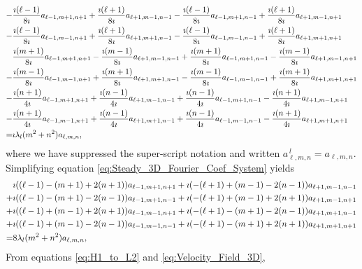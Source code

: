 \documentclass{article}
\newcommand{\0}{\mathbf{0}}
\newcommand{\1}{\mathbf{1}}
\newcommand{\2}{\mathbf{2}}
\newcommand{\3}{\mathbf{3}}
\newcommand{\4}{\mathbf{4}}
\newcommand{\5}{\mathbf{5}}
\newcommand{\6}{\mathbf{6}}
\newcommand{\7}{\mathbf{7}}
\newcommand{\8}{\mathbf{8}}
\begin{document}
\begin{align}\label{eq:Steady_3D_Fourier_Coef_System}
-&\frac{\imath(\ell-1)}{8\imath}a_{\ell-1,m+1,n+1}+\frac{\imath(\ell+1)}{8\imath}a_{\ell+1,m-1,n-1}
 -\frac{\imath(\ell-1)}{8\imath}a_{\ell-1,m+1,n-1}+\frac{\imath(\ell+1)}{8\imath}a_{\ell+1,m-1,n+1}\notag\\
 -&\frac{\imath(\ell-1)}{8\imath}a_{\ell-1,m-1,n+1}+\frac{\imath(\ell+1)}{8\imath}a_{\ell+1,m+1,n-1}
  -\frac{\imath(\ell-1)}{8\imath}a_{\ell-1,m-1,n-1}+\frac{\imath(\ell+1)}{8\imath}a_{\ell+1,m+1,n+1}
\notag\\
&\frac{\imath(m+1)}{8\imath}a_{\ell-1,m+1,n+1}-\frac{\imath(m-1)}{8\imath}a_{\ell+1,m-1,n-1}
  +\frac{\imath(m+1)}{8\imath}a_{\ell-1,m+1,n-1}-\frac{\imath(m-1)}{8\imath}a_{\ell+1,m-1,n+1}\notag\\
 -&\frac{\imath(m-1)}{8\imath}a_{\ell-1,m-1,n+1}+\frac{\imath(m+1)}{8\imath}a_{\ell+1,m+1,n-1}
  -\frac{\imath(m-1)}{8\imath}a_{\ell-1,m-1,n-1}+\frac{\imath(m+1)}{8\imath}a_{\ell+1,m+1,n+1}
\notag\\
-&\frac{\imath(n+1)}{4\imath}a_{\ell-1,m+1,n+1}+\frac{\imath(n-1)}{4\imath}a_{\ell+1,m-1,n-1}
  +\frac{\imath(n-1)}{4\imath}a_{\ell-1,m+1,n-1}-\frac{\imath(n+1)}{4\imath}a_{\ell+1,m-1,n+1}\notag\\
 -&\frac{\imath(n+1)}{4\imath}a_{\ell-1,m-1,n+1}+\frac{\imath(n-1)}{4\imath}a_{\ell+1,m+1,n-1}
  +\frac{\imath(n-1)}{4\imath}a_{\ell-1,m-1,n-1}-\frac{\imath(n+1)}{4\imath}a_{\ell+1,m+1,n+1}
\notag\\
=&\imath\lambda_l(m^2+n^2)a_{\ell,m,n},
\end{align}
%
where we have suppressed the super-script notation and written
$a^{\,l}_{\ell,m,n}=a_{\ell,m,n}$. Simplifying equation
\eqref{eq:Steady_3D_Fourier_Coef_System} yields
%
\begin{align}\label{eq:Steady_3D_Fourier_Coef_System_Simp}
 &\imath((\ell-1)-(m+1)+2(n+1))a_{\ell-1,m+1,n+1}+\imath(-(\ell+1)+(m-1)-2(n-1))a_{\ell+1,m-1,n-1}\notag\\
+&\imath((\ell-1)-(m+1)-2(n-1))a_{\ell-1,m+1,n-1}+\imath(-(\ell+1)+(m-1)+2(n+1))a_{\ell+1,m-1,n+1}\notag\\
+&\imath((\ell-1)+(m-1)+2(n+1))a_{\ell-1,m-1,n+1}+\imath(-(\ell+1)-(m+1)-2(n-1))a_{\ell+1,m+1,n-1}\notag\\
+&\imath((\ell-1)+(m-1)-2(n-1))a_{\ell-1,m-1,n-1}+\imath(-(\ell+1)-(m+1)+2(n+1))a_{\ell+1,m+1,n+1}\notag\\
=&8\lambda_l(m^2+n^2)a_{\ell,m,n},
\end{align}
%
From equations \eqref{eq:H1_to_L2} and \eqref{eq:Velocity_Field_3D},
\end{document}
